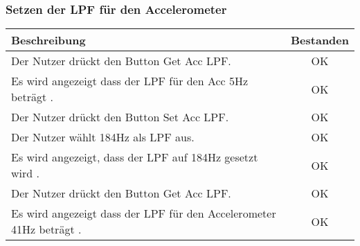 \documentclass[a4paper,12pt]{article}
\begin{document}
\subsubsection{Setzen der LPF für den Accelerometer}
\begin{tabular}{ | p{12cm} | c| }
	\hline
	\textbf{Beschreibung} & \textbf{Bestanden}\\
	\hline
	Der Nutzer drückt den Button \glqq{}Get Acc LPF\grqq{}. & OK\\
	\hline
	Es wird angezeigt dass der LPF für den Acc 5Hz beträgt . & OK\\
	\hline
	Der Nutzer drückt den Button \glqq{}Set Acc LPF\grqq{}. & OK\\
	\hline
	Der Nutzer wählt 184Hz als LPF aus. & OK \\
	\hline
	Es wird angezeigt, dass der LPF auf 184Hz gesetzt wird . & OK \\
	\hline
	Der Nutzer drückt den Button \glqq{}Get Acc LPF\grqq{}. & OK\\
	\hline
	Es wird angezeigt dass der LPF für den Accelerometer 41Hz beträgt . & OK\\
	\hline
\end{tabular}
\end{document}

